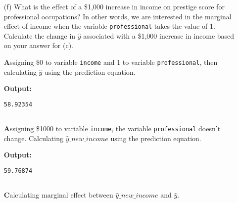 \documentclass[12pt,letterpaper]{article}
\begin{document}
\begin{enumerate}
	\noindent There is a positive and statistically reliable relationship between the professional and prestige, such that in comparisson to non-professional, an one unit increase in professional, on average, is associated with the increase of 37.78128 units in prestige score, under controlling for the effects of all other predictor variables in the model.
	\vspace{1 cm}
	

	\item [(f)]
	What is the effect of a \$1,000 increase in income on prestige score for professional occupations? In other words, we are interested in the marginal effect of income when the variable \texttt{professional} takes the value of $1$. Calculate the change in $\hat{y}$ associated with a \$1,000 increase in income based on your answer for (c).\vspace{0.5cm}
	
		\noindent \textbf Assigning \$0 to variable \texttt{income} and 1 to variable \texttt{professional}, then calculating  $\hat{y}$ using the prediction equation. 
	\vspace{0.5cm}
	

	  
	\vspace{.25cm}
	
	\noindent \textbf{Output: }
	\begin{verbatim}
58.92354
 
	\end{verbatim}  
	\vspace{.25cm}
	
		\noindent \textbf Assigning \$1000 to variable \texttt{income}, the variable \texttt{professional} doesn't change. Calculating  $\hat{y}\_new\_income$ using the prediction equation. 
	\vspace{0.5cm}
	

	  
	\vspace{.25cm}
	
	\noindent \textbf{Output: }
	\begin{verbatim}
59.76874
		
	\end{verbatim}  
	\vspace{.25cm}
	
		\noindent \textbf Calculating marginal effect between $\hat{y}\_new\_income$ and $\hat{y}$.
	\vspace{0.5cm}


\end{enumerate}
\end{document}
